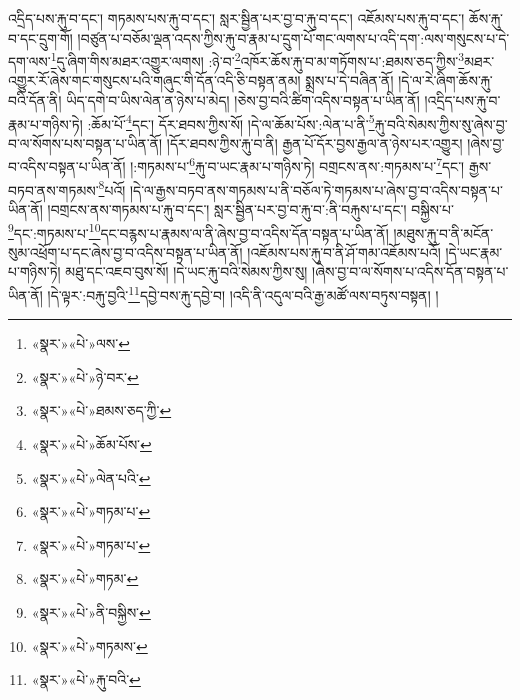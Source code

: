 འདྲིད་པས་རྐུ་བ་དང་། གཏམས་པས་རྐུ་བ་དང་། སླར་སྦྱིན་པར་བྱ་བ་རྐུ་བ་དང་། འཇོམས་པས་རྐུ་བ་དང་། ཆོས་རྐུ་བ་དང་དྲུག་གོ། །བཙུན་པ་བཅོམ་ལྡན་འདས་ཀྱིས་རྐུ་བ་རྣམ་པ་དྲུག་པོ་གང་ལགས་པ་འདི་དག་:ལས་གསུངས་པ་དེ་དག་ལས་\footnote{«སྣར་»«པེ་»ལས་}དུ་ཞིག་གིས་མཐར་འགྱུར་ལགས། :ཉེ་བ་\footnote{«སྣར་»«པེ་»ཉེ་བར་}འཁོར་ཆོས་རྐུ་བ་མ་གཏོགས་པ་:ཐམས་ཅད་ཀྱིས་\footnote{«སྣར་»«པེ་»ཐམས་ཅད་ཀྱི་}མཐར་འགྱུར་རོ་ཞེས་གང་གསུངས་པའི་གཞུང་གི་དོན་འདི་ཅི་བསྟན་ནམ། སྨྲས་པ་དེ་བཞིན་ནོ། །དེ་ལ་རེ་ཞིག་ཆོས་རྐུ་བའི་དོན་ནི། ཡིད་དགེ་བ་ཡིས་ལེན་ན་ཉེས་པ་མེད། །ཅེས་བྱ་བའི་ཚིག་འདིས་བསྟན་པ་ཡིན་ནོ། །འདྲིད་པས་རྐུ་བ་རྣམ་པ་གཉིས་ཏེ། :ཆོམ་པོ་\footnote{«སྣར་»«པེ་»ཆོམ་པོས་}དང་། དོར་ཐབས་ཀྱིས་སོ། །དེ་ལ་ཆོམ་པོས་:ལེན་པ་ནི་\footnote{«སྣར་»«པེ་»ལེན་པའི་}རྐུ་བའི་སེམས་ཀྱིས་སུ་ཞེས་བྱ་བ་ལ་སོགས་པས་བསྟན་པ་ཡིན་ནོ། །དོར་ཐབས་ཀྱིས་རྐུ་བ་ནི། རྒྱན་པོ་དོར་བྱས་རྒྱལ་ན་ཉེས་པར་འགྱུར། །ཞེས་བྱ་བ་འདིས་བསྟན་པ་ཡིན་ནོ། །:གཏམས་པ་\footnote{«སྣར་»«པེ་»གཏམ་པ་}རྐུ་བ་ཡང་རྣམ་པ་གཉིས་ཏེ། བགྲངས་ནས་:གཏམས་པ་\footnote{«སྣར་»«པེ་»གཏམ་པ་}དང་། རྒྱས་བཏབ་ནས་གཏམས་\footnote{«སྣར་»«པེ་»གཏམ་}པའོ། །དེ་ལ་རྒྱས་བཏབ་ནས་གཏམས་པ་ནི་བཅོལ་ཏེ་གཏམས་པ་ཞེས་བྱ་བ་འདིས་བསྟན་པ་ཡིན་ནོ། །བགྲངས་ནས་གཏམས་པ་རྐུ་བ་དང་། སླར་སྦྱིན་པར་བྱ་བ་རྐུ་བ་:ནི་བརྐུས་པ་དང་། བསྐྱིས་པ་\footnote{«སྣར་»«པེ་»ནི་བསྐྱིས་}དང་:གཏམས་པ་\footnote{«སྣར་»«པེ་»གཏམས་}དང་བརྙས་པ་རྣམས་ལ་ནི་ཞེས་བྱ་བ་འདིས་དོན་བསྟན་པ་ཡིན་ནོ། །མཐུས་རྐུ་བ་ནི་མངོན་སུམ་འཕྲོག་པ་དང་ཞེས་བྱ་བ་འདིས་བསྟན་པ་ཡིན་ནོ། །འཇོམས་པས་རྐུ་བ་ནི་ཤོ་གམ་འཇོམས་པའོ། །དེ་ཡང་རྣམ་པ་གཉིས་ཏེ། མཐུ་དང་འཇབ་བུས་སོ། །དེ་ཡང་རྐུ་བའི་སེམས་ཀྱིས་སུ། །ཞེས་བྱ་བ་ལ་སོགས་པ་འདིས་དོན་བསྟན་པ་ཡིན་ནོ། །དེ་ལྟར་:བརྐུ་བྱའི་\footnote{«སྣར་»«པེ་»རྐུ་བའི་}དབྱེ་བས་རྐུ་དབྱེ་བ། །འདི་ནི་འདུལ་བའི་རྒྱ་མཚོ་ལས་བཏུས་བསྟན། །

